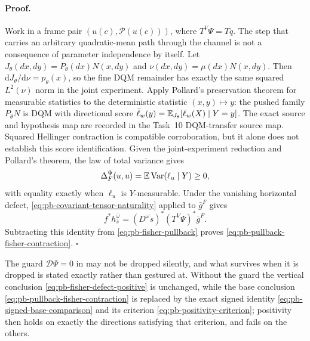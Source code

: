 \paragraph{Proof.}
Work in a frame pair $(u(c),\mathcal P(u(c)))$, where $T^V\Psi=Tq$.  The step
that carries an arbitrary quadratic-mean path through the channel is not a
consequence of parameter independence by itself.  Let
$J_\theta(dx,dy)=P_\theta(dx)N(x,dy)$ and
$\nu(dx,dy)=\mu(dx)N(x,dy)$.  Then
$\mathrm dJ_\theta/\mathrm d\nu=p_\theta(x)$, so the fine DQM remainder has
exactly the same squared $L^2(\nu)$ norm in the joint experiment. Apply
Pollard's preservation theorem for measurable statistics \citep{Pollard2013}
to the deterministic statistic
$(x,y)\mapsto y$: the
pushed family $P_\theta N$ is DQM with directional score
$\bar\ell_w(y)=\mathbb E_{J_\theta}[\ell_w(X)\mid Y=y]$.  The exact source and
hypothesis map are recorded in the Task~10 DQM-transfer source map.  Squared
Hellinger contraction is compatible corroboration, but it alone does not
establish this score identification.  Given the joint-experiment reduction
and Pollard's theorem, the law of total variance gives
\begin{equation}
\Delta_F^\Psi(u,u)
=\mathbb E\operatorname{Var}(\ell_u\mid Y)\geq0,
\label{eq:pb-fisher-defect-score-variance}
\end{equation}
with equality exactly when $\ell_u$ is $Y$-measurable.  Under the
vanishing horizontal defect,
\eqref{eq:pb-covariant-tensor-naturality} applied to $\bar g^F$ gives
\[
f^*h_{\bar s}^{\bar\omega}
=(D^\omega s)^*(T^V\Psi)^*\bar g^F.
\]
Subtracting this identity from \eqref{eq:pb-fisher-pullback} proves
\eqref{eq:pb-pullback-fisher-contraction}.  $\square$

The guard $\mathcal D\Psi=0$ in  may not be
dropped silently, and what survives when it is dropped is stated exactly rather
than gestured at.  Without the guard the vertical conclusion
\eqref{eq:pb-fisher-defect-positive} is unchanged, while the base conclusion
\eqref{eq:pb-pullback-fisher-contraction} is replaced by the exact signed
identity \eqref{eq:pb-signed-base-comparison} and its criterion
\eqref{eq:pb-positivity-criterion}; positivity then holds on exactly the
directions satisfying that criterion, and fails on the others.

